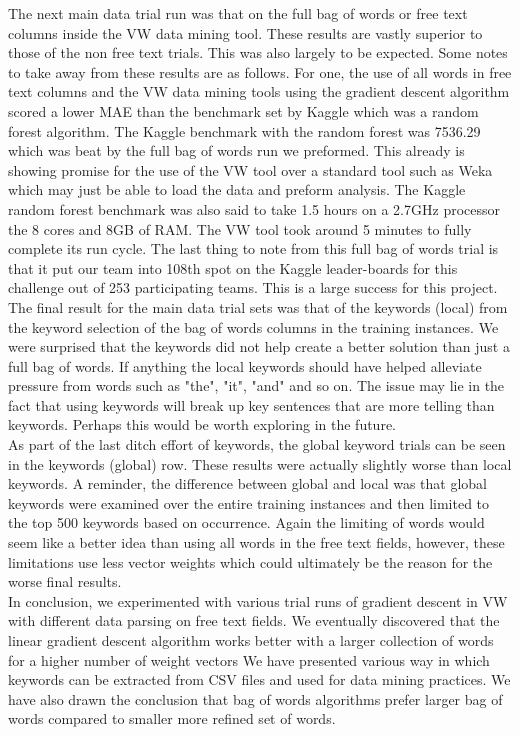The next main data trial run was that on the full bag of words or free text columns inside the VW data mining tool.
These results are vastly superior to those of the non free text trials. This was also largely to be expected. Some
notes to take away from these results are as follows. For one, the use of all words in free text columns and the
VW data mining tools using the gradient descent algorithm scored a lower MAE than the benchmark set by Kaggle
which was a random forest algorithm. The Kaggle benchmark with the random forest was 7536.29 which was beat
by the full bag of words run we preformed. This already is showing promise for the use of the VW tool over a standard
tool such as Weka which may just be able to load the data and preform analysis. The Kaggle random forest benchmark
was also said to take 1.5 hours on a 2.7GHz processor the 8 cores and 8GB of RAM. The VW tool took around 5 minutes
to fully complete its run cycle. The last thing to note from this full bag of words trial is that it put our
team into 108th spot on the Kaggle leader-boards for this challenge out of 253 participating teams. This is a large
success for this project.\\

The final result for the main data trial sets was that of the keywords (local) from the keyword selection of the bag
of words columns in the training instances. We were surprised that the keywords did not help create a better solution
than just a full bag of words. If anything the local keywords should have helped alleviate pressure from words
such as "the", "it", "and" and so on. The issue may lie in the fact that using keywords will break up key sentences
that are more telling than keywords. Perhaps this would be worth exploring in the future.\\

As part of the last ditch effort of keywords, the global keyword trials can be seen in the keywords (global) row.
These results were actually slightly worse than local keywords. A reminder, the difference between global and local
was that global keywords were examined over the entire training instances and then limited to the top 500 keywords
based on occurrence. Again the limiting of words would seem like a better idea than using all words in the free
text fields, however, these limitations use less vector weights which could ultimately be the reason for the 
worse final results.\\

In conclusion, we experimented with various trial runs of gradient descent in VW with different data parsing
on free text fields. We eventually discovered that the linear gradient descent algorithm works better with
a larger collection of words for a higher number of weight vectors We have presented various way in which
keywords can be extracted from CSV files and used for data mining practices. We have also drawn the conclusion
that bag of words algorithms prefer larger bag of words compared to smaller more refined set of words.